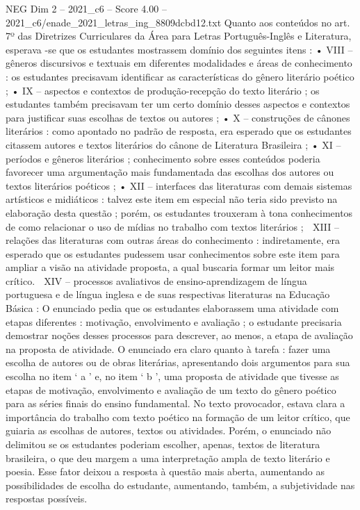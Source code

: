 \begin{textsample}{NEG Dim 2 – 2021\_c6 – Score 4.00 – 2021\_c6/enade\_2021\_letras\_ing\_8809dcbd12.txt}
Quanto aos conteúdos no art. 7º das Diretrizes Curriculares da Área para Letras Português-Inglês e Literatura, esperava -se que os estudantes mostrassem domínio dos seguintes itens : • VIII – gêneros discursivos e textuais em diferentes modalidades e áreas de conhecimento : os estudantes precisavam identificar as características do gênero literário poético ; • IX – aspectos e contextos de produção-recepção do texto literário ; os estudantes também precisavam ter um certo domínio desses aspectos e contextos para justificar suas escolhas de textos ou autores ; • X – construções de cânones literários : como apontado no padrão de resposta, era esperado que os estudantes citassem autores e textos literários do cânone de Literatura Brasileira ; • XI – períodos e gêneros literários ; conhecimento sobre esses conteúdos poderia favorecer uma argumentação mais fundamentada das escolhas dos autores ou textos literários poéticos ; • XII – interfaces das literaturas com demais sistemas artísticos e midiáticos : talvez este item em especial não teria sido previsto na elaboração desta questão ; porém, os estudantes trouxeram à tona conhecimentos de como relacionar o uso de mídias no trabalho com textos literários ;  XIII – relações das literaturas com outras áreas do conhecimento : indiretamente, era esperado que os estudantes pudessem usar conhecimentos sobre este item para ampliar a visão na atividade proposta, a qual buscaria formar um leitor mais crítico.  XIV – processos avaliativos de ensino-aprendizagem de língua portuguesa e de língua inglesa e de suas respectivas literaturas na Educação Básica : O enunciado pedia que os estudantes elaborassem uma atividade com etapas diferentes : motivação, envolvimento e avaliação ; o estudante precisaria demostrar noções desses processos para descrever, ao menos, a etapa de avaliação na proposta de atividade.
O enunciado era claro quanto à tarefa : fazer uma escolha de autores ou de obras literárias, apresentando dois argumentos para sua escolha no item ‘ a ’ e, no item ‘ b ’, uma proposta de atividade que tivesse as etapas de motivação, envolvimento e avaliação de um texto do gênero poético para as séries finais do ensino fundamental.
No texto provocador, estava clara a importância do trabalho com texto poético na formação de um leitor crítico, que guiaria as escolhas de autores, textos ou atividades.
Porém, o enunciado não delimitou se os estudantes poderiam escolher, apenas, textos de literatura brasileira, o que deu margem a uma interpretação ampla de texto literário e poesia.
Esse fator deixou a resposta à questão mais aberta, aumentando as possibilidades de escolha do estudante, aumentando, também, a subjetividade nas respostas possíveis.

\end{textsample}
